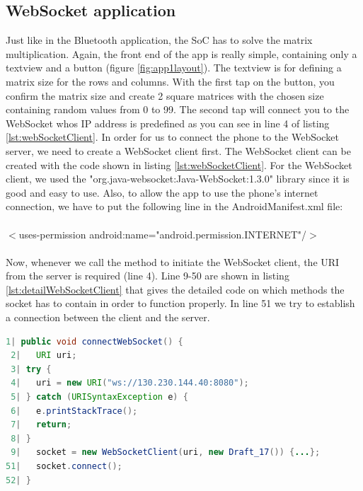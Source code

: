 \documentclass[a4paper, 11pt]{report}
\begin{document}
	\subsection{WebSocket application}\label{subsec:webapp}
Just like in the Bluetooth application, the SoC has to solve the matrix multiplication. Again, the front end of the app is really simple, containing only a textview and a button (figure \ref{fig:app1layout}). The textview is for defining a matrix size for the rows and columns. With the first tap on the button, you confirm the matrix size and create 2 square matrices with the chosen size containing random values from 0 to 99. The second tap will connect you to the WebSocket whos IP address is predefined as you can see in line 4 of listing \ref{lst:webSocketClient}. In order for us to connect the phone to the WebSocket server, we need to create a WebSocket client first. The WebSocket client can be created with the code shown in listing \ref{lst:webSocketClient}. For the WebSocket client, we used the "org.java-websocket:Java-WebSocket:1.3.0" library since it is good and easy to use. Also, to allow the app to use the phone's internet connection, we have to put the following line in the AndroidManifest.xml file:\\\\
\indent $<$uses-permission android:name="android.permission.INTERNET"/$>$
\\\\
Now, whenever we call the method to initiate the WebSocket client, the URI from the server is required (line 4).  Line 9-50 are shown in listing \ref{lst:detailWebSocketClient} that gives the detailed code on which methods the socket has to contain in order to function properly. In line 51 we try to establish a connection between the client and the server.
\begin{lstlisting}[caption={Making a WebSocket client},captionpos=b, label={lst:webSocketClient}, language=java, float=h]
 1| public void connectWebSocket() {
 2|   URI uri;
 3| try {
 4|   uri = new URI("ws://130.230.144.40:8080");
 5| } catch (URISyntaxException e) {
 6|   e.printStackTrace();
 7|   return;
 8| }
 9|   socket = new WebSocketClient(uri, new Draft_17()) {...};
51|   socket.connect();
52| }
\end{lstlisting}\\
\end{document}
